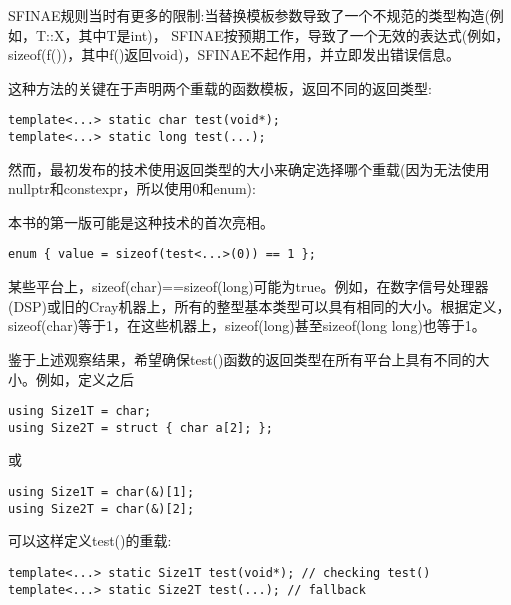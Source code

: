 \begin{tcolorbox}[colback=webgreen!5!white,colframe=webgreen!75!black]
\hspace*{0.75cm}SFINAE规则当时有更多的限制:当替换模板参数导致了一个不规范的类型构造(例如，T::X，其中T是int)， SFINAE按预期工作，导致了一个无效的表达式(例如，sizeof(f())，其中f()返回void)，SFINAE不起作用，并立即发出错误信息。
\end{tcolorbox}

这种方法的关键在于声明两个重载的函数模板，返回不同的返回类型:

\begin{lstlisting}[style=styleCXX]
template<...> static char test(void*);
template<...> static long test(...);
\end{lstlisting}

然而，最初发布的技术使用返回类型的大小来确定选择哪个重载(因为无法使用nullptr和constexpr，所以使用0和enum):

\begin{tcolorbox}[colback=webgreen!5!white,colframe=webgreen!75!black]
\hspace*{0.75cm}本书的第一版可能是这种技术的首次亮相。
\end{tcolorbox}

\begin{lstlisting}[style=styleCXX]
enum { value = sizeof(test<...>(0)) == 1 };
\end{lstlisting}

某些平台上，sizeof(char)==sizeof(long)可能为true。例如，在数字信号处理器(DSP)或旧的Cray机器上，所有的整型基本类型可以具有相同的大小。根据定义，sizeof(char)等于1，在这些机器上，sizeof(long)甚至sizeof(long long)也等于1。

鉴于上述观察结果，希望确保test()函数的返回类型在所有平台上具有不同的大小。例如，定义之后

\begin{lstlisting}[style=styleCXX]
using Size1T = char;
using Size2T = struct { char a[2]; };
\end{lstlisting}

或

\begin{lstlisting}[style=styleCXX]
using Size1T = char(&)[1];
using Size2T = char(&)[2];
\end{lstlisting}

可以这样定义test()的重载:

\begin{lstlisting}[style=styleCXX]
template<...> static Size1T test(void*); // checking test()
template<...> static Size2T test(...); // fallback
\end{lstlisting}

